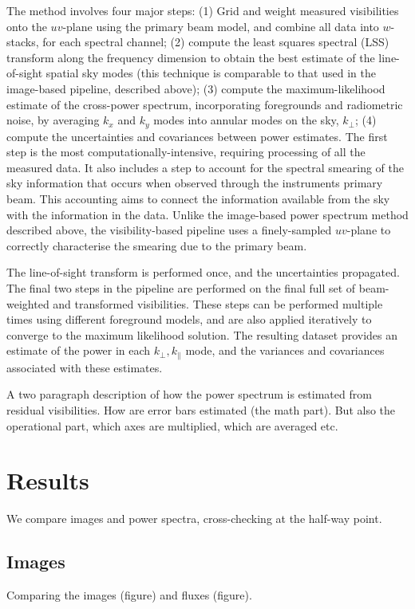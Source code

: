 \documentclass[preprint2]{aastex}
\begin{document}
The method involves four major steps: (1) Grid and weight measured visibilities onto the $uv$-plane using the primary beam model, and combine all data into $w$-stacks, for each spectral channel; (2) compute the least squares spectral (LSS) transform along the frequency dimension to obtain the best estimate of the line-of-sight spatial sky modes (this technique is comparable to that used in the image-based pipeline, described above); (3) compute the maximum-likelihood estimate of the cross-power spectrum, incorporating foregrounds and radiometric noise, by averaging $k_x$ and $k_y$ modes into annular modes on the sky, $k_\bot$; (4) compute the uncertainties and covariances between power estimates. The first step is the most computationally-intensive, requiring processing of all the measured data. It also includes a step to account for the spectral smearing of the sky information that occurs when observed through the instruments primary beam. This accounting aims to connect the information available from the sky with the information in the data. Unlike the image-based power spectrum method described above, the visibility-based pipeline uses a finely-sampled $uv$-plane to correctly characterise the smearing due to the primary beam.

The line-of-sight transform is performed once, and the uncertainties propagated. The final two steps in the pipeline are performed on the final full set of beam-weighted and transformed visibilities. These steps can be performed multiple times using different foreground models, and are also applied iteratively to converge to the maximum likelihood solution. The resulting dataset provides an estimate of the power in each $k_\bot,k_\parallel$ mode, and the variances and covariances associated with these estimates.

A two paragraph description of how the power spectrum is estimated from residual visibilities.  How are error bars estimated (the math part). But also the operational part, which axes are multiplied, which are averaged etc.  



\section{Results}
We compare images and power spectra, cross-checking at the half-way point.

\subsection{Images}
Comparing the images (figure) and fluxes (figure). 
\end{document}

